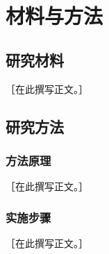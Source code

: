 \chapter{材料与方法}
\label{chap:methods}
\section{研究材料}
［在此撰写正文。］
\section{研究方法}
\subsection{方法原理}
［在此撰写正文。］
\subsection{实施步骤}
［在此撰写正文。］
